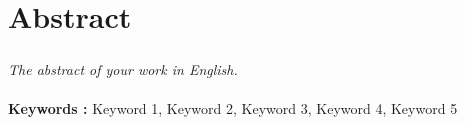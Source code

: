 
\chapter*{Abstract}
\paragraph{}
\textit{The abstract of your work in English.} \\[0.5cm]
\lipsum[1-2] \\
\textbf{Keywords :} Keyword 1, Keyword 2, Keyword 3, Keyword 4, Keyword 5
